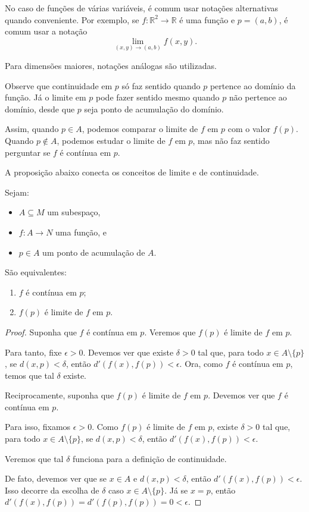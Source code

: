 No caso de funções de várias variáveis, é comum usar notações alternativas quando conveniente.
Por exemplo, se $f:\mathbb R^2 \to \mathbb R$ é uma função e $p=(a, b)$, é comum usar a notação
\[
    \lim_{(x, y)\to (a, b)} f(x, y).
\]

Para dimensões maiores, notações análogas são utilizadas.
\smallskip


Observe que continuidade em $p$ só faz sentido quando $p$ pertence ao domínio da função.
Já o limite em $p$ pode fazer sentido mesmo quando $p$ não pertence ao domínio, desde que $p$ seja ponto de acumulação do domínio.

Assim, quando $p\in A$, podemos comparar o limite de $f$ em $p$ com o valor $f(p)$.
Quando $p\notin A$, podemos estudar o limite de $f$ em $p$, mas não faz sentido perguntar se $f$ é contínua em $p$.

A proposição abaixo conecta os conceitos de limite e de continuidade.
\begin{proposition}\label{prop:continuidadeLimite}
    Sejam:
    \begin{itemize}
        \item $A\subseteq M$ um subespaço,
        \item $f: A \to N$ uma função, e
        \item $p \in A$ um ponto de acumulação de $A$.
    \end{itemize}

    São equivalentes:
    \begin{enumerate}[label=(\roman*)]
        \item $f$ é contínua em $p$;
        \item $f(p)$ é limite de $f$ em $p$.
    \end{enumerate}
\end{proposition}

\begin{proof}
    Suponha que $f$ é contínua em $p$.
    Veremos que $f(p)$ é limite de $f$ em $p$.

    Para tanto, fixe $\epsilon>0$.
    Devemos ver que existe $\delta>0$ tal que, para todo $x \in A\setminus\{p\}$, se $d(x, p) < \delta$, então $d'(f(x), f(p)) < \epsilon$.
    Ora, como $f$ é contínua em $p$, temos que tal $\delta$ existe.
    \smallskip
    
    Reciprocamente, suponha que $f(p)$ é limite de $f$ em $p$.
    Devemos ver que $f$ é contínua em $p$.

    Para isso, fixamos $\epsilon>0$.
    Como $f(p)$ é limite de $f$ em $p$, existe $\delta>0$ tal que, para todo $x \in A\setminus\{p\}$, se $d(x, p) < \delta$, então $d'(f(x), f(p)) < \epsilon$.

    Veremos que tal $\delta$ funciona para a definição de continuidade.

    De fato, devemos ver que se $x \in A$ e $d(x, p) < \delta$, então $d'(f(x), f(p)) < \epsilon$.
    Isso decorre da escolha de $\delta$ caso $x \in A\setminus\{p\}$.
    Já se $x = p$, então $d'(f(x), f(p)) = d'(f(p), f(p)) = 0 < \epsilon$.
\end{proof}

